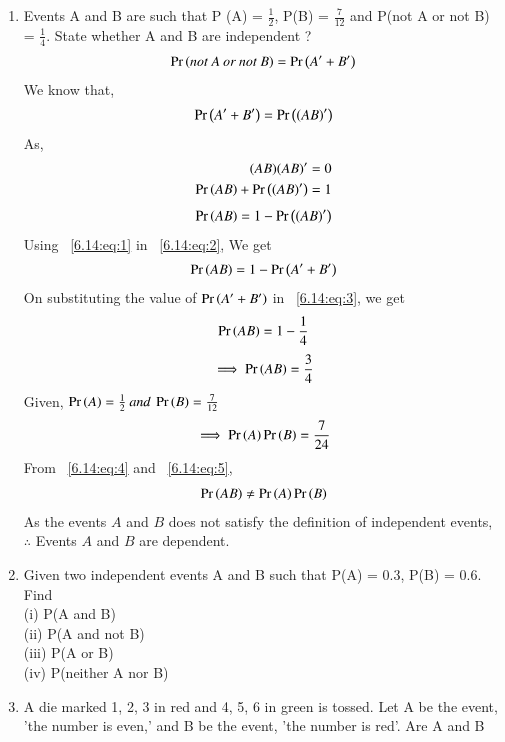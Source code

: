\begin{enumerate}[label=\thesection.\arabic*.,ref=\thesection.\theenumi]
\item Events A and B are such that P (A) = $\frac{1}{2}$, P(B) = $\frac{7}{12}$ and P(not A or not B) = $\frac{1}{4}$. State whether A and B are independent ?\\
\solution
\begin{align}
\Pr\left(not\: A \:or\: not\: B\right) = \Pr\left(A' + B'\right) 
\end{align}
We know that,\\
\begin{align} \label{6.14:eq:1}
 \Pr\left(A' + B'\right) = \Pr\left((AB)'\right)
\end{align}
As,\\
\begin{align}
(AB)(AB)' = 0 \\
\Pr\left(AB\right) + \Pr\left((AB)'\right) = 1
\end{align}
\begin{align} \label{6.14:eq:2}
\Pr\left(AB\right) = 1- \Pr\left((AB)'\right)
\end{align}
Using ~\ref{6.14:eq:1} in ~\ref{6.14:eq:2}, We get
\begin{align} \label{6.14:eq:3}
\Pr\left(AB\right) = 1- \Pr\left(A' + B'\right)
\end{align}
On substituting the value of $\Pr\left(A' + B'\right)$ in ~\ref{6.14:eq:3}, we get
\begin{align}
\Pr\left(AB\right) = 1- \frac{1}{4}
\end{align}
\begin{align} \label{6.14:eq:4}
 \implies \Pr\left(AB\right) = \frac{3}{4}
\end{align}
Given,
$\Pr\left(A\right) = \frac{1}{2} \:and \:\Pr\left(B\right) = \frac{7}{12}$
\begin{align} \label{6.14:eq:5}
\implies \Pr\left(A\right)\Pr\left(B\right) = \frac{7}{24}
\end{align}
From ~\ref{6.14:eq:4} and ~\ref{6.14:eq:5},
\begin{align}
 \Pr\left(AB\right)\neq \Pr\left(A\right)\Pr\left(B\right)
\end{align}
As the events $A$ and $B$ does not satisfy the definition of independent events,
$\therefore$ Events $A$ and $B$ are dependent.
%
\item Given two independent events A and B such that P(A) = 0.3, P(B) = 0.6. Find\\
(i) P(A and B)\\
(ii) P(A and not B)\\
(iii) P(A or B)\\
(iv) P(neither A nor B)\\
%
\solution

\item A die marked 1, 2, 3 in red and 4, 5, 6 in green is tossed. Let A be the event, 'the number is even,' and B be the event, 'the number is red'. Are A and B

\end{enumerate}
